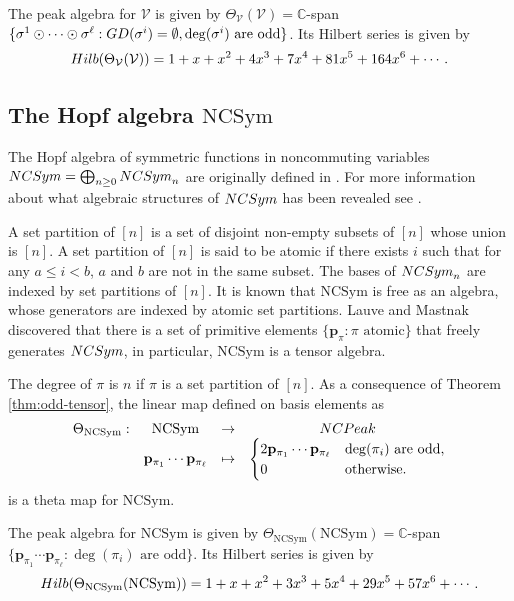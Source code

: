 \documentclass[12pt]{amsart}
\numberwithin{equation}{section}
\newcommand{\NCSym}{\mathrm{NCSym}}
\begin{document}
The peak algebra for $\mathcal{V}$ is given by $\Theta_{\mathcal{V}}(\mathcal{V})=\mathbb{C}$-span$\{\sigma^1\odot\cdots\odot\sigma^\ell:\rm{GD}(\sigma^i)=\emptyset,\deg(\sigma^i)\text{ are odd}\}$. Its Hilbert series is given by
$$\rm{Hilb}(\Theta_{\mathcal{V}}(\mathcal{V}))=1+x+x^2+4x^3+7x^4+81x^5+164x^6+\cdots.$$

\subsection{The Hopf algebra $\NCSym$}

The Hopf algebra of symmetric functions in noncommuting variables ${\rm NCSym}=\bigoplus_{n\geq 0}{\rm NCSym}_n$ are originally defined in \cite{W36}. For more information about what algebraic structures of ${\rm NCSym}$ has been revealed  see \cite[Introduction]{A21}. 

A set partition of $[n]$ is a set of disjoint non-empty subsets of $[n]$ whose union is $[n]$.  A set partition of $[n]$ is said to be atomic if there exists $i$ such that for any $a\leq i<b$, $a$ and $b$ are not in the same subset. The bases of ${\rm NCSym}_n$ are indexed by set partitions of $[n]$. It is known that $\NCSym$ is free as an algebra, whose generators are indexed by atomic set partitions. Lauve and Mastnak \cite{L11} discovered that there is a set of primitive elements $\{\mathbf{p}_\pi:\pi \text{~atomic}\}$ that freely generates ${\rm NCSym}$, in particular, $\NCSym$ is a tensor algebra.

The degree of $\pi$ is $n$ if $\pi$ is a set partition of $[n]$. As a consequence of Theorem \ref{thm:odd-tensor}, the linear map defined on basis elements as
$$\begin{array}{cccc}
\Theta_{\NCSym}: & \NCSym& \rightarrow & {\rm NCPeak}\\
& \mathbf{p}_{\pi_1}\cdots\mathbf{p}_{\pi_\ell} & \mapsto & \begin{cases}
2 \mathbf{p}_{\pi_1}\cdots\mathbf{p}_{\pi_\ell} & \deg(\pi_i)\text{ are odd},\\
0 & \text{otherwise.}
\end{cases}  \end{array}$$
is a theta map for $\NCSym$.

The peak algebra for $\NCSym$ is given by $\Theta_\NCSym(\NCSym)=\mathbb{C}$-span$\{\mathbf{p}_{\pi_1}\cdots\mathbf{p}_{\pi_\ell}:\deg(\pi_i)\text{ are odd}\}$. Its Hilbert series is given by
$$\rm{Hilb}(\Theta_{\NCSym}(\NCSym))=1+x+x^2+3x^3+5x^4+29x^5+57x^6+\cdots.$$
\end{document}
